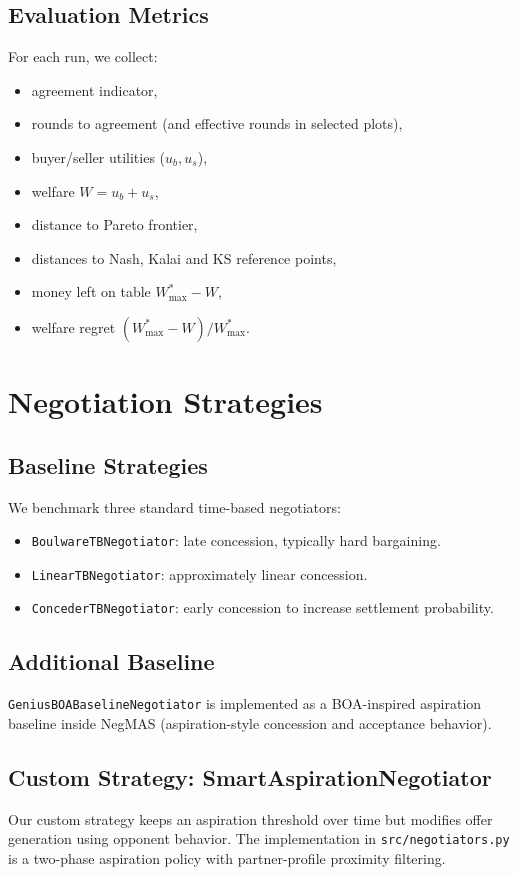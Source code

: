 \documentclass[11pt]{article}
\begin{document}
\subsection{Evaluation Metrics}
For each run, we collect:
\begin{itemize}[leftmargin=1.5em]
    \item agreement indicator,
    \item rounds to agreement (and effective rounds in selected plots),
    \item buyer/seller utilities (\(u_b, u_s\)),
    \item welfare \(W=u_b+u_s\),
    \item distance to Pareto frontier,
    \item distances to Nash, Kalai and KS reference points,
    \item money left on table \(W^*_{\max}-W\),
    \item welfare regret \((W^*_{\max}-W)/W^*_{\max}\).
\end{itemize}

\section{Negotiation Strategies}
\subsection{Baseline Strategies}
We benchmark three standard time-based negotiators:
\begin{itemize}[leftmargin=1.5em]
    \item \texttt{BoulwareTBNegotiator}: late concession, typically hard bargaining.
    \item \texttt{LinearTBNegotiator}: approximately linear concession.
    \item \texttt{ConcederTBNegotiator}: early concession to increase settlement probability.
\end{itemize}

\subsection{Additional Baseline}
\texttt{GeniusBOABaselineNegotiator} is implemented as a BOA-inspired aspiration baseline inside NegMAS (aspiration-style concession and acceptance behavior).

\subsection{Custom Strategy: SmartAspirationNegotiator}
Our custom strategy keeps an aspiration threshold over time but modifies offer generation using opponent behavior. The implementation in \texttt{src/negotiators.py} is a two-phase aspiration policy with partner-profile proximity filtering.
\end{document}
